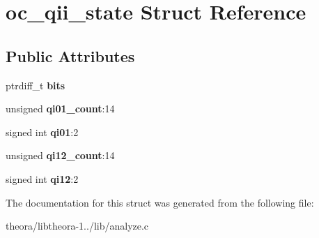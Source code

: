 \hypertarget{structoc__qii__state}{\section{oc\+\_\+qii\+\_\+state Struct Reference}
\label{structoc__qii__state}
}
\subsection*{Public Attributes}
\begin{DoxyCompactItemize}
\item 
\hypertarget{structoc__qii__state_ade36a3436af3c043574ca3d880654a73}{ptrdiff\+\_\+t {\bfseries bits}}\label{structoc__qii__state_ade36a3436af3c043574ca3d880654a73}

\item 
\hypertarget{structoc__qii__state_a22ed8e99a26d1928297e6d434c641f8c}{unsigned {\bfseries qi01\+\_\+count}\+:14}\label{structoc__qii__state_a22ed8e99a26d1928297e6d434c641f8c}

\item 
\hypertarget{structoc__qii__state_a55fcdb8079144b443dac26014070ad68}{signed int {\bfseries qi01}\+:2}\label{structoc__qii__state_a55fcdb8079144b443dac26014070ad68}

\item 
\hypertarget{structoc__qii__state_a086164a6b763db33ca9e83bf08a4b832}{unsigned {\bfseries qi12\+\_\+count}\+:14}\label{structoc__qii__state_a086164a6b763db33ca9e83bf08a4b832}

\item 
\hypertarget{structoc__qii__state_a9ee4d4d7fcf0625dbf1600944e033350}{signed int {\bfseries qi12}\+:2}\label{structoc__qii__state_a9ee4d4d7fcf0625dbf1600944e033350}

\end{DoxyCompactItemize}


The documentation for this struct was generated from the following file\+:\begin{DoxyCompactItemize}
\item 
theora/libtheora-\/1../lib/analyze.\+c\end{DoxyCompactItemize}
